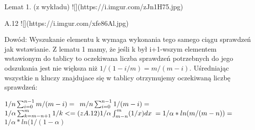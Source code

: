\documentclass[12pt]{article}
\begin{document}
Lemat 1. (z wykładu)
![](https://i.imgur.com/zJn1H75.jpg)

A.12 
![](https://i.imgur.com/xfe86Al.jpg)



Dowód:
Wyszukanie elementu k wymaga wykonania tego samego ciągu sprawdzeń jak wstawianie. Z lematu 1 mamy, że jeśli k był i+1-wszym elementem wstawionym do tablicy to oczekiwana liczba sprawdzeń potrzebnych do jego odszukania jest nie większa niż $1/(1 - i/m) = m/(m-i)$. Uśredniając wszystkie n kluczy znajdujace się w tablicy otrzymujemy oczekiwaną liczbę sprawdzeń:

$1/n \sum_{i=0}^{n-1} m/(m-i) = \\$
$m/n \sum_{i=0}^{n-1} 1/(m-i) =\\$
$1/\alpha \sum_{k=m-n+1}^{m} 1/k <= (z A.12)\\ 1/\alpha \int_{m-n}^m (1/x) dx\\  $
$= 1/\alpha * ln(m/(m-n))=\\$
$1/\alpha * ln(1/(1-\alpha)$

\egroup
\end{document}
